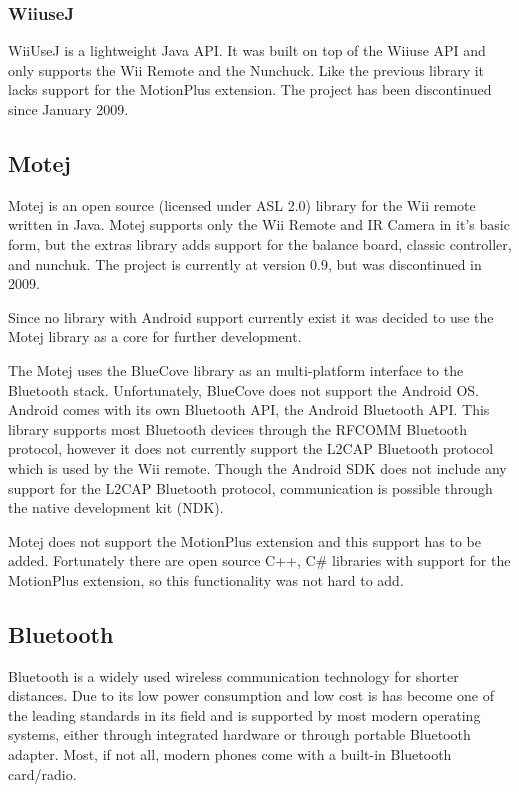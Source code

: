 \documentclass[11pt,twoside,a4paper]{report}
\begin{document}
\subsubsection{WiiuseJ}
WiiUseJ is a lightweight Java API. It was built on top of the Wiiuse API and only supports the Wii Remote and the Nunchuck. Like the previous library it lacks support for the MotionPlus extension. The project has been discontinued since January 2009. \cite{Wiiusej}

\subsection{Motej}
Motej is an open source (licensed under ASL 2.0) library for the Wii remote written in Java. Motej supports only the Wii Remote and IR Camera in it's basic form, but the extras library adds support for the balance board, classic controller, and nunchuk. The project is currently at version 0.9, but was discontinued in 2009. \cite{Motej}

Since no library with Android support currently exist it was decided to use the Motej library as a core for further development.

The Motej uses the BlueCove library as an multi-platform interface to the Bluetooth stack. Unfortunately, BlueCove does not support the Android OS. Android comes with its own Bluetooth API, the Android Bluetooth API. This library supports most Bluetooth devices through the RFCOMM Bluetooth protocol, however it does not currently support the L2CAP Bluetooth protocol which is used by the Wii remote. Though the Android SDK does not include any support for the L2CAP Bluetooth protocol, communication is possible through the native development kit (NDK). %

Motej does not support the MotionPlus extension and this support has to be added. Fortunately there are open source C++, C\# libraries with support for the MotionPlus extension, so this functionality was not hard to add.


\subsection{Bluetooth}
Bluetooth is a widely used wireless communication technology for shorter distances. Due to its low power consumption and low cost is has become one of the leading standards in its field and is supported by most modern operating systems, either through integrated hardware or through portable Bluetooth adapter. Most, if not all, modern phones come with a built-in Bluetooth card/radio. %
\end{document}
